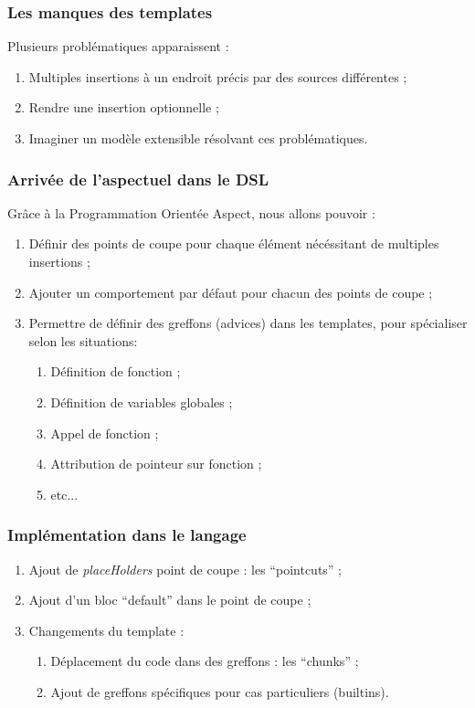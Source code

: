 \documentclass[]{beamer}
\begin{document}
\begin{frame}
\frametitle{Les manques des templates}
Plusieurs problématiques apparaissent :
\begin{enumerate}
    \item Multiples insertions à un endroit précis par des sources
        différentes ;
    \item Rendre une insertion optionnelle ;
    \item Imaginer un modèle extensible résolvant ces problématiques.
\end{enumerate}
\end{frame}

\begin{frame}
\frametitle{Arrivée de l'aspectuel dans le DSL}
Grâce à la Programmation Orientée Aspect, nous allons pouvoir :
\begin{enumerate}[<+->]
    \item Définir des points de coupe pour chaque élément nécéssitant de
        multiples insertions ;
    \item Ajouter un comportement par défaut pour chacun des points de coupe ;
    \item Permettre de définir des greffons (advices) dans les templates,
        pour spécialiser selon les situations:
        \begin{enumerate}
            \item Définition de fonction ;
            \item Définition de variables globales ;
            \item Appel de fonction ;
            \item Attribution de pointeur sur fonction ;
            \item etc...
        \end{enumerate}
\end{enumerate}
\end{frame}

\begin{frame}
\frametitle{Implémentation dans le langage}
\begin{enumerate}[<+->]
    \item Ajout de \emph{placeHolders} point de coupe : les ``pointcuts'' ;
    \item Ajout d'un bloc ``default'' dans le point de coupe ;
    \item Changements du template :
        \begin{enumerate}
            \item Déplacement du code dans des greffons : les ``chunks'' ;
            \item Ajout de greffons spécifiques pour cas particuliers
                (builtins).
        \end{enumerate}
\end{enumerate}
\end{frame}
\end{document}
